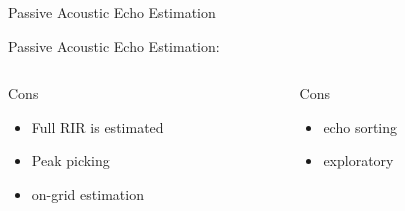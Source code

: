 \begin{frame}{Passive Acoustic Echo Estimation}
\begin{block}{\alert{Passive} Acoustic Echo Estimation:}
        \vspace{1em}
        \begin{columns}[T,onlytextwidth] %
            \begin{column}{.48\textwidth}
                Cons
                \begin{itemize}
                    \item Full RIR is estimated
                    \item Peak picking
                    \item on-grid estimation %
                \end{itemize}
            \end{column}
            \begin{column}{.48\textwidth}
                Cons
                \begin{itemize}
                    \item echo sorting
                    \item exploratory
                \end{itemize}
            \end{column}%
        \end{columns}

    \end{block}

\end{frame}

